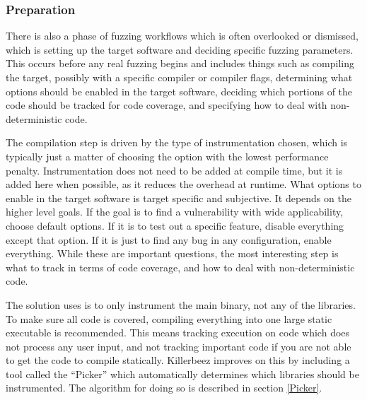\subsubsection{Preparation}  \label{Preparation Overview}
There is also a phase of fuzzing workflows which is often overlooked or
dismissed, which is setting up the target software and deciding specific
fuzzing parameters. This occurs before any real fuzzing begins and includes
things such as compiling the target, possibly with a specific compiler or
compiler flags, determining what options should be enabled in the target
software, deciding which portions of the code should be tracked for code
coverage, and specifying how to deal with non-deterministic code.

The compilation step is driven by the type of instrumentation chosen,
which is typically just a matter of choosing the option with the lowest
performance penalty. Instrumentation does not need to be added at compile
time, but it is added here when possible, as it reduces the overhead at runtime.
What options to enable in the target software is target specific and
subjective.  It depends on the higher level goals.  If the goal is to find a
vulnerability with wide applicability, choose default options. If it is to test
out a specific feature, disable everything except that option. If it is just to
find any bug in any configuration, enable everything.  While these are
important questions, the most interesting step is what to track in terms of
code coverage, and how to deal with non-deterministic code.

The solution \AFL{} uses is to only instrument the main binary, not any of the
libraries. To make sure all code is covered, compiling everything into one
large static executable is recommended. This means tracking execution on code
which does not process any user input, and not tracking important code if you
are not able to get the code to compile statically. Killerbeez improves on this
by including a tool
called the ``Picker'' which automatically determines which libraries should be
instrumented.  The algorithm for doing so is described in section \ref{Picker}.

